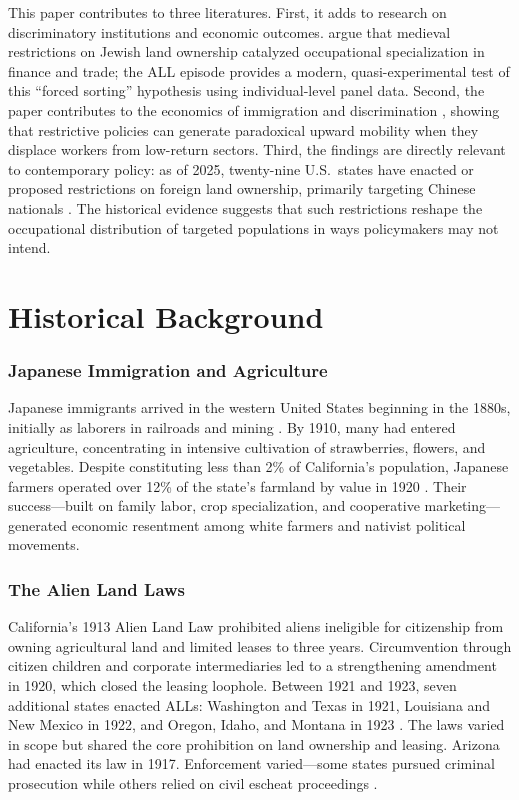 \documentclass[12pt]{article}
\begin{document}
This paper contributes to three literatures. First, it adds to research on discriminatory institutions and economic outcomes. \citet{botticini2012chosen} argue that medieval restrictions on Jewish land ownership catalyzed occupational specialization in finance and trade; the ALL episode provides a modern, quasi-experimental test of this ``forced sorting'' hypothesis using individual-level panel data. Second, the paper contributes to the economics of immigration and discrimination \citep{abramitzky2012europe, abramitzky2014nation}, showing that restrictive policies can generate paradoxical upward mobility when they displace workers from low-return sectors. Third, the findings are directly relevant to contemporary policy: as of 2025, twenty-nine U.S.\ states have enacted or proposed restrictions on foreign land ownership, primarily targeting Chinese nationals \citep{chen2024alien}. The historical evidence suggests that such restrictions reshape the occupational distribution of targeted populations in ways policymakers may not intend.

\section{Historical Background}

\subsubsection*{Japanese Immigration and Agriculture} Japanese immigrants arrived in the western United States beginning in the 1880s, initially as laborers in railroads and mining \citep{takaki1998strangers}. By 1910, many had entered agriculture, concentrating in intensive cultivation of strawberries, flowers, and vegetables. Despite constituting less than 2\% of California's population, Japanese farmers operated over 12\% of the state's farmland by value in 1920 \citep{iwata1962japanese}. Their success---built on family labor, crop specialization, and cooperative marketing---generated economic resentment among white farmers and nativist political movements.

\subsubsection*{The Alien Land Laws} California's 1913 Alien Land Law prohibited aliens ineligible for citizenship from owning agricultural land and limited leases to three years. Circumvention through citizen children and corporate intermediaries led to a strengthening amendment in 1920, which closed the leasing loophole. Between 1921 and 1923, seven additional states enacted ALLs: Washington and Texas in 1921, Louisiana and New Mexico in 1922, and Oregon, Idaho, and Montana in 1923 \citep{ferguson2015alien}. The laws varied in scope but shared the core prohibition on land ownership and leasing. Arizona had enacted its law in 1917. Enforcement varied---some states pursued criminal prosecution while others relied on civil escheat proceedings \citep{chuman1976bamboo}.
\end{document}
